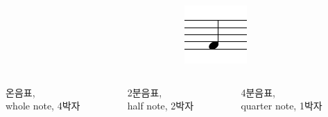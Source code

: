 \documentclass{beamer}
\begin{document}
\begin{frame}
\begin{columns}
\begin{column}{0.33\textwidth}
\begin{figure}[h!]
				\end{figure}
			\end{column}
			\begin{column}{0.33\textwidth}
				\centering
				\noindent
				\begin{figure}[h!]
					\includegraphics[width=0.7\columnwidth]{res/pdf/4/note/quarter.pdf}
				\end{figure}
			\end{column}
		\end{columns}
		\vskip -1pc
		\begin{columns}
			\begin{column}{0.33\textwidth}
				\centering
				\small 온음표,\\whole note, 4박자
			\end{column}
			\begin{column}{0.33\textwidth}
				\centering
				\small 2분음표,\\half note, 2박자
			\end{column}
			\begin{column}{0.33\textwidth}
				\centering
				\small 4분음표,\\quarter note, 1박자
			\end{column}
		\end{columns}
		\vskip -1pc
		\begin{columns}
			\begin{column}{0.33\textwidth}
				\centering
				\noindent
				\begin{figure}[h!]

\end{figure}
\end{column}
\end{columns}
\end{frame}
\end{document}
